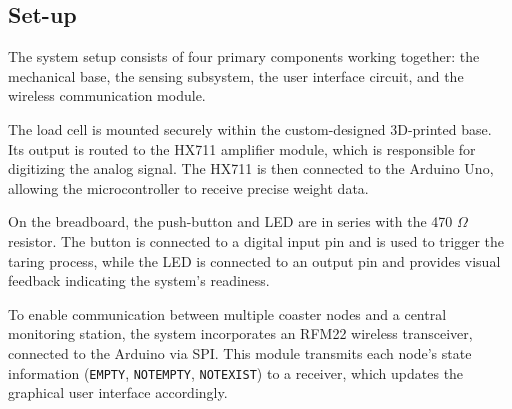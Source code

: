 \subsection{Set-up}
The system setup consists of four primary components working together: the mechanical base, the sensing subsystem, the user interface circuit, and the wireless communication module.

The load cell is mounted securely within the custom-designed 3D-printed base. Its output is routed to the HX711 amplifier module, which is responsible for digitizing the analog signal. The HX711 is then connected to the Arduino Uno, allowing the microcontroller to receive precise weight data.

On the breadboard, the push-button and LED are in series with the 470 $\Omega$ resistor. The button is connected to a digital input pin and is used to trigger the taring process, while the LED is connected to an output pin and provides visual feedback indicating the system’s readiness.

To enable communication between multiple coaster nodes and a central monitoring station, the system incorporates an RFM22 wireless transceiver, connected to the Arduino via SPI. This module transmits each node’s state information (\texttt{EMPTY}, \texttt{NOTEMPTY}, \texttt{NOTEXIST}) to a receiver, which updates the graphical user interface accordingly.

